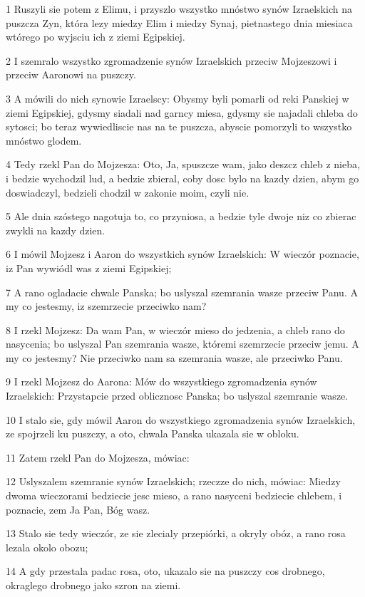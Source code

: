 \par 1 Ruszyli sie potem z Elimu, i przyszlo wszystko mnóstwo synów Izraelskich na puszcza Zyn, która lezy miedzy Elim i miedzy Synaj, pietnastego dnia miesiaca wtórego po wyjsciu ich z ziemi Egipskiej.
\par 2 I szemralo wszystko zgromadzenie synów Izraelskich przeciw Mojzeszowi i przeciw Aaronowi na puszczy.
\par 3 A mówili do nich synowie Izraelscy: Obysmy byli pomarli od reki Panskiej w ziemi Egipskiej, gdysmy siadali nad garncy miesa, gdysmy sie najadali chleba do sytosci; bo teraz wywiedliscie nas na te puszcza, abyscie pomorzyli to wszystko mnóstwo glodem.
\par 4 Tedy rzekl Pan do Mojzesza: Oto, Ja, spuszcze wam, jako deszcz chleb z nieba, i bedzie wychodzil lud, a bedzie zbieral, coby dosc bylo na kazdy dzien, abym go doswiadczyl, bedzieli chodzil w zakonie moim, czyli nie.
\par 5 Ale dnia szóstego nagotuja to, co przyniosa, a bedzie tyle dwoje niz co zbierac zwykli na kazdy dzien.
\par 6 I mówil Mojzesz i Aaron do wszystkich synów Izraelskich: W wieczór poznacie, iz Pan wywiódl was z ziemi Egipskiej;
\par 7 A rano ogladacie chwale Panska; bo uslyszal szemrania wasze przeciw Panu. A my co jestesmy, iz szemrzecie przeciwko nam?
\par 8 I rzekl Mojzesz: Da wam Pan, w wieczór mieso do jedzenia, a chleb rano do nasycenia; bo uslyszal Pan szemrania wasze, któremi szemrzecie przeciw jemu. A my co jestesmy? Nie przeciwko nam sa szemrania wasze, ale przeciwko Panu.
\par 9 I rzekl Mojzesz do Aarona: Mów do wszystkiego zgromadzenia synów Izraelskich: Przystapcie przed oblicznosc Panska; bo uslyszal szemranie wasze.
\par 10 I stalo sie, gdy mówil Aaron do wszystkiego zgromadzenia synów Izraelskich, ze spojrzeli ku puszczy, a oto, chwala Panska ukazala sie w obloku.
\par 11 Zatem rzekl Pan do Mojzesza, mówiac:
\par 12 Uslyszalem szemranie synów Izraelskich; rzeczze do nich, mówiac: Miedzy dwoma wieczorami bedziecie jesc mieso, a rano nasyceni bedziecie chlebem, i poznacie, zem Ja Pan, Bóg wasz.
\par 13 Stalo sie tedy wieczór, ze sie zlecialy przepiórki, a okryly obóz, a rano rosa lezala okolo obozu;
\par 14 A gdy przestala padac rosa, oto, ukazalo sie na puszczy cos drobnego, okraglego drobnego jako szron na ziemi.

